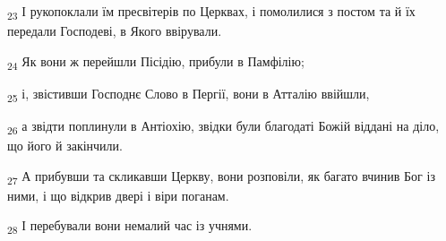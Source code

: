 \begin{tcolorbox}
\textsubscript{23} І рукопоклали їм пресвітерів по Церквах, і помолилися з постом та й їх передали Господеві, в Якого ввірували.
\end{tcolorbox}
\begin{tcolorbox}
\textsubscript{24} Як вони ж перейшли Пісідію, прибули в Памфілію;
\end{tcolorbox}
\begin{tcolorbox}
\textsubscript{25} і, звістивши Господнє Слово в Пергії, вони в Атталію ввійшли,
\end{tcolorbox}
\begin{tcolorbox}
\textsubscript{26} а звідти поплинули в Антіохію, звідки були благодаті Божій віддані на діло, що його й закінчили.
\end{tcolorbox}
\begin{tcolorbox}
\textsubscript{27} А прибувши та скликавши Церкву, вони розповіли, як багато вчинив Бог із ними, і що відкрив двері і віри поганам.
\end{tcolorbox}
\begin{tcolorbox}
\textsubscript{28} І перебували вони немалий час із учнями.
\end{tcolorbox}

